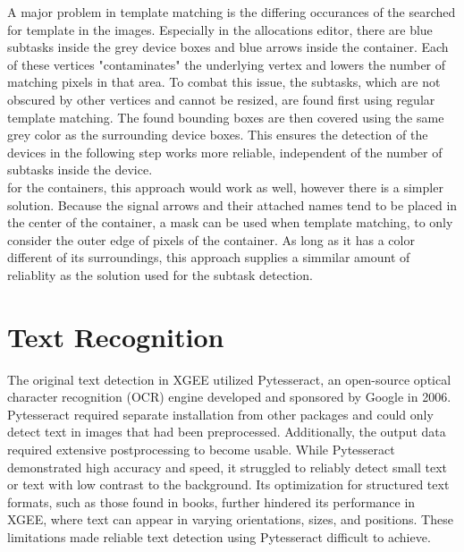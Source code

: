 A major problem in template matching is the differing occurances of the searched for template in the images. Especially in the allocations editor, there are blue subtasks inside the grey device boxes and blue arrows inside the container. Each of these vertices "contaminates" the underlying vertex and lowers the number of matching pixels in that area. To combat this issue, the subtasks, which are not obscured by other vertices and cannot be resized, are found first using regular template matching. The found bounding boxes are then covered using the same grey color as the surrounding device boxes. This ensures the detection of the devices in the following step works more reliable, independent of the number of subtasks inside the device.\\
for the containers, this approach would work as well, however there is a simpler solution. Because the signal arrows and their attached names tend to be placed in the center of the container, a mask can be used when template matching, to only consider the outer edge of pixels of the container. As long as it has a color different of its surroundings, this approach supplies a simmilar amount of reliablity as the solution used for the subtask detection.

\section{Text Recognition}
The original text detection in XGEE utilized Pytesseract, an open-source optical character recognition (OCR) engine developed and sponsored by Google in 2006. Pytesseract required separate installation from other packages and could only detect text in images that had been preprocessed. Additionally, the output data required extensive postprocessing to become usable. While Pytesseract demonstrated high accuracy and speed, it struggled to reliably detect small text or text with low contrast to the background. Its optimization for structured text formats, such as those found in books, further hindered its performance in XGEE, where text can appear in varying orientations, sizes, and positions. These limitations made reliable text detection using Pytesseract difficult to achieve.
